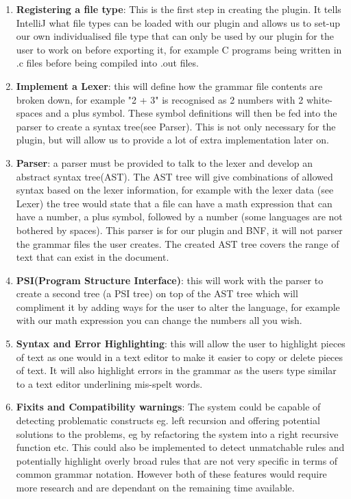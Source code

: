 \begin{enumerate}
	\item \textbf{Registering a file type}: This is the first step in creating the plugin. It tells IntelliJ what file types can be loaded with our plugin and allows us to set-up our own individualised file type that can only be used by our plugin for the user to work on before exporting it, for example C programs being written in .c files before being compiled into .out files.
	\item \textbf{Implement a Lexer}: this will define how the grammar file contents are broken down, for example "2 + 3" is recognised as 2 numbers with 2 white-spaces and a plus symbol. These symbol definitions will then be fed into the parser to create a syntax tree(see Parser). This is not only necessary for the plugin, but will allow us to provide a lot of extra implementation later on.
	\item \textbf{Parser}: a parser must be provided to talk to the lexer and develop an abstract syntax tree(AST). The AST tree will give combinations of allowed syntax based on the lexer information, for example with the lexer data (see Lexer) the tree would state that a file can have a math expression that can have a number, a plus symbol, followed by a number (some languages are not bothered by spaces). This parser is for our plugin and BNF, it will not parser the grammar files the user creates. The created AST tree covers the range of text that can exist in the document.
	\item \textbf{PSI(Program Structure Interface)}: this will work with the parser to create a second tree (a PSI tree) on top of the AST tree which will compliment it by adding ways for the user to alter the language, for example with our math expression you can change the numbers all you wish. 
	\item \textbf{Syntax and Error Highlighting}: this will allow the user to highlight pieces of text as one would in a text editor to make it easier to copy or delete pieces of text. It will also highlight errors in the grammar as the users type similar to a text editor underlining mis-spelt words.
	\item \textbf{Fixits and Compatibility warnings}: The system could be capable of detecting problematic constructs eg. left recursion and offering potential solutions to the problems, eg by refactoring the system into a right recursive function etc. This could also be implemented to detect unmatchable rules and potentially highlight overly broad rules that are not very specific in terms of common grammar notation. However both of these features would require more research and are dependant on the remaining time available. 

\end{enumerate}

